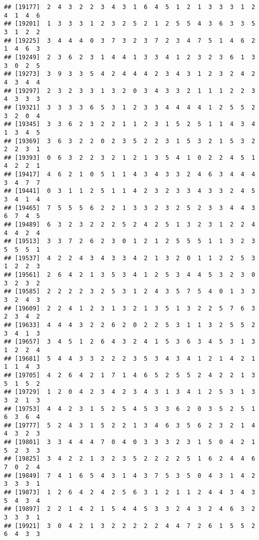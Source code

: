 \documentclass[
]{article}
\begin{document}
\begin{verbatim}
## [19177]  2  4  3  2  2  3  4  3  1  6  4  5  1  2  1  3  3  3  1  2  4  1  4  6
## [19201]  1  3  3  3  1  2  3  2  5  2  1  2  5  5  4  3  6  3  3  5  3  1  2  2
## [19225]  3  4  4  4  0  3  7  3  2  3  7  2  3  4  7  5  1  4  6  2  1  4  6  3
## [19249]  2  3  6  2  3  1  4  4  1  3  3  4  1  2  3  2  3  6  1  3  3  0  2  5
## [19273]  3  9  3  3  5  4  2  4  4  4  2  3  4  3  1  2  3  2  4  2  4  3  4  4
## [19297]  2  3  2  3  3  1  3  2  0  3  4  3  3  2  1  1  1  2  2  3  4  3  3  3
## [19321]  3  3  3  3  6  5  3  1  2  3  3  4  4  4  4  1  2  5  5  2  3  2  0  4
## [19345]  3  3  6  2  3  2  2  1  1  2  3  1  5  2  5  1  1  4  3  4  1  3  4  5
## [19369]  3  6  3  2  2  0  2  3  5  2  2  3  1  5  3  2  1  5  3  2  2  2  3  1
## [19393]  0  6  3  2  2  3  2  1  2  1  3  5  4  1  0  2  2  4  5  1  4  2  2  1
## [19417]  4  6  2  1  0  5  1  1  4  3  4  3  3  2  4  6  3  4  4  4  3  4  7  7
## [19441]  0  3  1  1  2  5  1  1  4  2  3  2  3  3  4  3  3  2  4  5  3  4  1  4
## [19465]  7  5  5  5  6  2  2  1  3  3  2  3  2  5  2  3  3  4  4  3  6  7  4  5
## [19489]  6  3  2  3  2  2  2  5  2  4  2  5  1  3  2  3  1  2  2  4  4  4  2  4
## [19513]  3  3  7  2  6  2  3  0  1  2  1  2  5  5  5  1  1  3  2  3  5  5  5  1
## [19537]  4  2  2  4  3  4  3  3  4  2  1  3  2  0  1  1  2  2  5  3  1  2  2  3
## [19561]  2  6  4  2  1  3  5  3  4  1  2  5  3  4  4  5  3  2  3  0  3  2  3  2
## [19585]  2  2  2  2  3  2  5  3  1  2  4  3  5  7  5  4  0  1  3  3  3  2  4  3
## [19609]  2  2  4  1  2  3  1  3  2  1  3  5  1  3  2  2  5  7  6  3  2  3  4  2
## [19633]  4  4  4  3  2  2  6  2  0  2  2  5  3  1  1  3  2  5  5  2  3  4  1  3
## [19657]  3  4  5  1  2  6  4  3  2  4  1  5  3  6  3  4  5  3  1  3  1  2  2  4
## [19681]  5  4  4  3  3  2  2  2  3  5  3  4  3  4  1  2  1  4  2  1  1  1  4  3
## [19705]  4  2  6  4  2  1  7  1  4  6  5  2  5  5  2  4  2  2  1  3  5  1  5  2
## [19729]  1  2  0  4  2  3  4  2  3  4  3  1  3  4  1  2  5  3  1  3  3  2  1  3
## [19753]  4  4  2  3  1  5  2  5  4  5  3  3  6  2  0  3  5  2  5  1  6  3  6  4
## [19777]  5  2  4  3  1  5  2  2  1  3  4  6  3  5  6  2  3  2  1  4  4  3  2  3
## [19801]  3  3  4  4  4  7  0  4  0  3  3  3  2  3  1  5  0  4  2  1  5  2  3  3
## [19825]  3  4  2  2  1  3  2  3  5  2  2  2  2  5  1  6  2  4  4  6  7  0  2  4
## [19849]  7  4  1  6  5  4  3  1  4  3  7  5  3  5  0  4  3  1  4  2  3  3  3  1
## [19873]  1  2  6  4  2  4  2  5  6  3  1  2  1  1  2  4  4  3  4  3  5  4  3  4
## [19897]  2  2  1  4  2  1  5  4  4  5  3  3  2  4  3  2  4  6  3  2  3  3  3  1
## [19921]  3  0  4  2  1  3  2  2  2  2  2  4  4  7  2  6  1  5  5  2  6  4  3  3

\end{verbatim}
\end{document}

